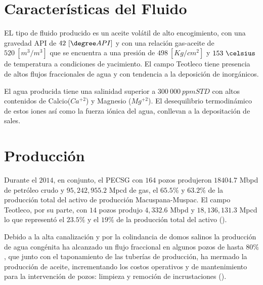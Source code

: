 \section{Características del Fluido}
EL tipo de fluido producido es un aceite volátil de alto encogimiento, con una gravedad API de $42~[\degree API]$ y con una relación gas-aceite de $520~[m^{3}/m^{3}] $ que se encuentra a una presión de $498~[Kg/cm^2]$ y $153~\celsius$ de temperatura a condiciones de yacimiento. El campo Teotleco tiene presencia de altos flujos fraccionales de agua y con tendencia a la deposición de inorgánicos.

El agua producida tiene una salinidad superior a $300~000~ppm STD$ con altos contenidos de Calcio($Ca^{+2}$) y Magnesio ($Mg^{+2}$). El desequilibrio termodinámico de estos iones así como la fuerza iónica del agua, conllevan a la depositación de sales.

\section{Producción}
Durante el $2014$, en conjunto, el PECSG con $164$ pozos produjeron $18404.7$ Mbpd de petróleo crudo y $95,242,955.2$ Mpcd de gas, el $65.5\%$ y $63.2\%$ de la producción total del activo de producción Macuspana-Muspac.
El campo Teotleco, por su parte, con $14$ pozos produjo $4,332.6 $ Mbpd y $18,136,131.3$ Mpcd lo que representó el $23.5\%$ y el $19\%$ de la producción total del activo (\cite{ASF2014}).


Debido a la alta canalización y por la colindancia de domos salinos la producción de agua congénita ha alcanzado un flujo fraccional en algunos pozos de hasta $80\%$, que junto con el taponamiento de las tuberías de producción, ha mermado la producción de aceite, incrementando los costos operativos y de mantenimiento para la intervención de pozos: limpieza y remoción de incrustaciones (\cite{CMP2017}).  


